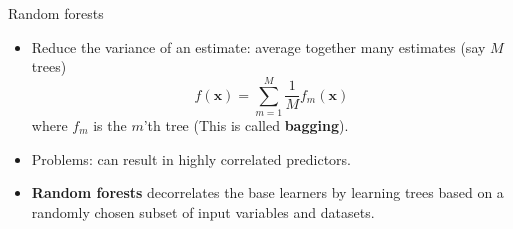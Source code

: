 \documentclass[10pt,mathserif]{beamer}
\begin{document}
\begin{frame}{Random forests}
\begin{itemize}
    \item Reduce the variance of an estimate:  average together many estimates (say $M$ trees)
    \begin{equation*}
        f(\bm{x}) =  \sum_{m=1}^M \frac{1}{M}f_m(\bm{x})
    \end{equation*}
    where $f_m$ is the $m$'th tree (This is called \textbf{bagging}).
    \item Problems: can result in highly correlated predictors.
    \item \textbf{Random forests} decorrelates the base learners by learning trees based on a randomly chosen subset of input variables and datasets.
\end{itemize}
\end{frame}
\end{document}
